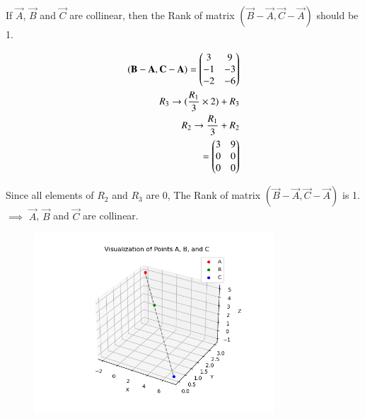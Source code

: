 \documentclass[journal]{IEEEtran}
\begin{document}
If $\vec{A}$, $\vec{B}$ and $\vec{C}$ are collinear, then the Rank of matrix $(\vec{B} - \vec{A},\vec{C} - \vec{A})$ should be 1.

\begin{align}
(\mathbf{B} - \mathbf{A},\mathbf{C} - \mathbf{A}) = \begin{pmatrix}3&9\\-1&-3\\-2&-6\end{pmatrix}  \\ 
R_3 \rightarrow (\frac{R_1}{3}\times2) + R_3  \\
R_2 \rightarrow \frac{R_1}{3} + R_2  \\
= \begin{pmatrix}3&9\\0&0\\0&0\end{pmatrix}  \\
\end{align}

Since all elements of $R_2$ and $R_3$ are 0, The Rank of matrix $(\vec{B} - \vec{A},\vec{C} - \vec{A})$ is 1.  \\
$\implies$ $\vec{A}$, $\vec{B}$ and $\vec{C}$ are collinear.

\begin{figure}[H]
    \centering
    \includegraphics[width=0.8\textwidth]{figs/Fig 1.png}
    \caption{}
    \label{fig:Parallelogram}
\end{figure}
\end{document}

